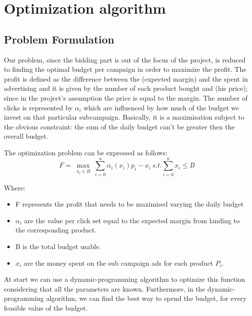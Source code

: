 \chapter{Optimization algorithm}
\label{chap:opt_alg}

\section{Problem Formulation}
\label{sec:Opt_Problem Formulation}
Our problem, since the bidding part is out of the focus of the project, is reduced to finding the optimal budget per campaign in order to maximize the profit.
The profit is defined as the difference between the (expected margin) and the spent in advertising and it is given by the number of each product bought and (his price); since in the project's assumption the price is equal to the margin.
The number of clicks is represented by $\alpha_i$ which are influenced by how much of the budget we invest on that particular subcampaign.
Basically, it is a maximisation subject to the obvious constraint: the sum of the daily budget can't be greater then the overall budget.


The optimization problem can be expressed as follows:
\begin{displaymath}
F=\max_{\substack{x_i\in B}} \sum_{i=0}^n \alpha_i(x_i)p_i-x_i \ s.t. \sum_{i=0}^n x_i\leq B  
\end{displaymath}

Where: 
\begin{itemize}
    \item F represents the profit that needs to be maximised varying the daily budget 
    \item $\alpha_i$ are the value per click set equal to the expected margin from landing to the corresponding product.
    \item B is the total budget usable.
    \item $x_i$ are the money spent on the sub campaign ads for each product $P_i$.
\end{itemize}

At start we can use a dynamic-programming algorithm to optimize this function considering that all the parameters are known.
 Furthermore, in the dynamic-programming algorithm, we can find the best way to spend the budget, for every feasible value of the budget. 


